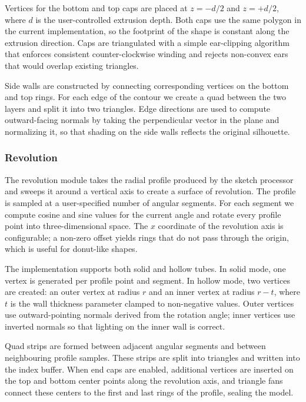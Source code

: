 \documentclass[11pt, a4paper]{article}
\begin{document}
Vertices for the bottom and top caps are placed at $z=-d/2$ and $z=+d/2$, where $d$ is the user-controlled extrusion depth. Both caps use the same polygon in the current implementation, so the footprint of the shape is constant along the extrusion direction. Caps are triangulated with a simple ear-clipping algorithm that enforces consistent counter-clockwise winding and rejects non-convex ears that would overlap existing triangles.

Side walls are constructed by connecting corresponding vertices on the bottom and top rings. For each edge of the contour we create a quad between the two layers and split it into two triangles. Edge directions are used to compute outward-facing normals by taking the perpendicular vector in the plane and normalizing it, so that shading on the side walls reflects the original silhouette.

\subsubsection{Revolution}
The revolution module takes the radial profile produced by the sketch processor and sweeps it around a vertical axis to create a surface of revolution. The profile is sampled at a user-specified number of angular segments. For each segment we compute cosine and sine values for the current angle and rotate every profile point into three-dimensional space. The $x$ coordinate of the revolution axis is configurable; a non-zero offset yields rings that do not pass through the origin, which is useful for donut-like shapes.

The implementation supports both solid and hollow tubes. In solid mode, one vertex is generated per profile point and segment. In hollow mode, two vertices are created: an outer vertex at radius $r$ and an inner vertex at radius $r - t$, where $t$ is the wall thickness parameter clamped to non-negative values. Outer vertices use outward-pointing normals derived from the rotation angle; inner vertices use inverted normals so that lighting on the inner wall is correct.

Quad strips are formed between adjacent angular segments and between neighbouring profile samples. These strips are split into triangles and written into the index buffer. When end caps are enabled, additional vertices are inserted on the top and bottom center points along the revolution axis, and triangle fans connect these centers to the first and last rings of the profile, sealing the model.
\end{document}
